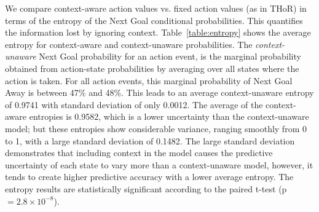 \documentclass[]{article}
\begin{document}
We  compare context-aware action values vs. fixed action values (as in THoR) in terms of   the entropy of the Next Goal conditional probabilities. This quantifies the information lost by ignoring context.
Table~\ref{table:entropy} shows the average entropy for context-aware and context-unaware probabilities.
%
The {\em context-unaware} Next Goal probability for an action event, is the marginal probability obtained from action-state probabilities by averaging over all states where the action is taken. For all action events, this marginal probability of Next Goal Away is between 47\% and 48\%.
This leads to an average context-unaware entropy of 0.9741 with standard deviation of only 0.0012.
The average of the context-aware entropies is 0.9582, which is a lower uncertainty than the context-unaware model; but  these entropies show considerable variance, ranging smoothly from 0 to 1, with a large standard deviation of 0.1482.
The large standard deviation demonstrates that including context in the model causes the predictive uncertainty of each state to vary more than a context-unaware model, however, it tends to create higher predictive accuracy with a lower average entropy.
The entropy results are statistically significant according to the paired t-test (p $=2.8\times10^{-8}$).
\end{document}
